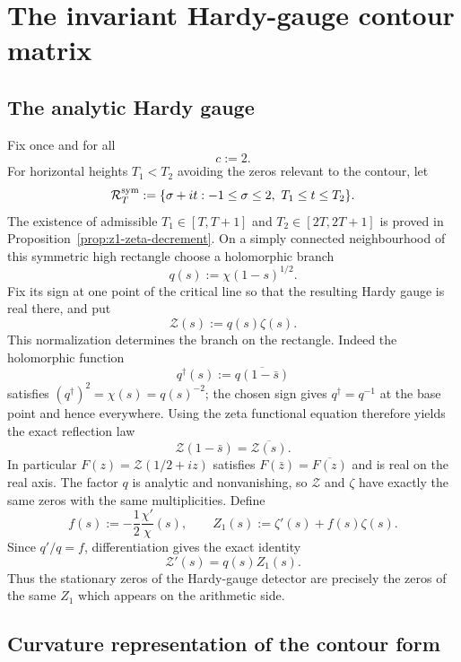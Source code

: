 \section{The invariant Hardy-gauge contour matrix}
\label{sec:common-matrix}

\subsection{The analytic Hardy gauge}

Fix once and for all
\[
c:=2.
\]
For horizontal heights $T_1<T_2$ avoiding the zeros relevant to the contour,
let
\begin{equation}
\mathcal R_T^{\rm sym}
:=\{\sigma+it:-1\le\sigma\le2,\ T_1\le t\le T_2\}.
\label{eq:symmetric-contour-rectangle}
\end{equation}
The existence of admissible $T_1\in[T,T+1]$ and
$T_2\in[2T,2T+1]$ is proved in
Proposition~\ref{prop:z1-zeta-decrement}. On a simply connected neighbourhood
of this symmetric high rectangle choose a holomorphic branch
\[
q(s):=\chi(1-s)^{1/2}.
\]
Fix its sign at one point of the critical line so that the resulting Hardy
gauge is real there, and put
\[
\mathscr Z(s):=q(s)\zeta(s).
\]
This normalization determines the branch on the rectangle. Indeed the
holomorphic function
\[
q^\dagger(s):=\overline{q(1-\bar s)}
\]
satisfies $(q^\dagger)^2=\chi(s)=q(s)^{-2}$; the chosen sign gives
$q^\dagger=q^{-1}$ at the base point and hence everywhere. Using the zeta
functional equation therefore yields the exact reflection law
\begin{equation}
\boxed{\mathscr Z(1-\bar s)=\overline{\mathscr Z(s)}.}
\label{eq:hardy-gauge-reflection}
\end{equation}
In particular $F(z)=\mathscr Z(1/2+iz)$ satisfies
$F(\bar z)=\overline{F(z)}$ and is real on the real axis. The factor $q$ is
analytic and nonvanishing, so $\mathscr Z$ and $\zeta$ have exactly the same
zeros with the same multiplicities. Define
\[
f(s):=-\frac12\frac{\chi'}{\chi}(s),
\qquad
Z_1(s):=\zeta'(s)+f(s)\zeta(s).
\]
Since $q'/q=f$, differentiation gives the exact identity
\begin{equation}
\boxed{\mathscr Z'(s)=q(s)Z_1(s).}
\label{eq:gauge-derivative}
\end{equation}
Thus the stationary zeros of the Hardy-gauge detector are precisely the zeros
of the same $Z_1$ which appears on the arithmetic side.

\subsection{Curvature representation of the contour form}

